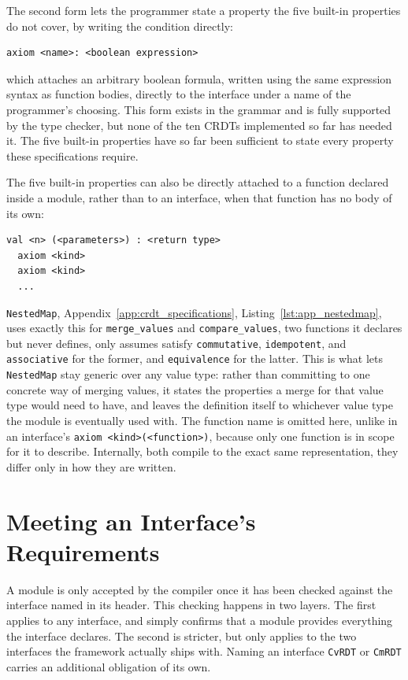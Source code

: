 The second form lets the programmer state a property the five built-in properties do not cover, by writing the condition
directly:

\begin{verbatim}
axiom <name>: <boolean expression>
\end{verbatim}

which attaches an arbitrary boolean formula, written using the same expression syntax as function bodies, directly to the
interface under a name of the programmer's choosing. This form exists in the grammar and is fully supported by the type
checker, but none of the ten CRDTs implemented so far has needed it. The five built-in properties have so far been
sufficient to state every property these specifications require.

The five built-in properties can also be directly attached to a function declared inside a module, rather than to an
interface, when that function has no body of its own:

\begin{verbatim}
val <n> (<parameters>) : <return type>
  axiom <kind>
  axiom <kind>
  ...
\end{verbatim}

\texttt{NestedMap}, Appendix~\ref{app:crdt_specifications}, Listing~\ref{lst:app_nestedmap}, uses exactly this for
\texttt{merge\_values} and \texttt{compare\_values}, two functions it declares but never defines, only assumes satisfy
\texttt{commutative}, \texttt{idempotent}, and \texttt{associative} for the former, and \texttt{equivalence} for the
latter. This is what lets \texttt{NestedMap} stay generic over any value type: rather than committing to one concrete way
of merging values, it states the properties a merge for that value type would need to have, and leaves the definition
itself to whichever value type the module is eventually used with. The function name is omitted here, unlike in an
interface's \texttt{axiom <kind>(<function>)}, because only one function is in scope for it to describe. Internally, both
compile to the exact same representation, they differ only in how they are written.

\section{Meeting an Interface's Requirements}
\label{sec:language-contracts}

A module is only accepted by the compiler once it has been checked against the interface named in its header. This
checking happens in two layers. The first applies to any interface, and simply confirms that a module provides everything
the interface declares. The second is stricter, but only applies to the two interfaces the framework actually ships with.
Naming an interface \texttt{CvRDT} or \texttt{CmRDT} carries an additional obligation of its own.

